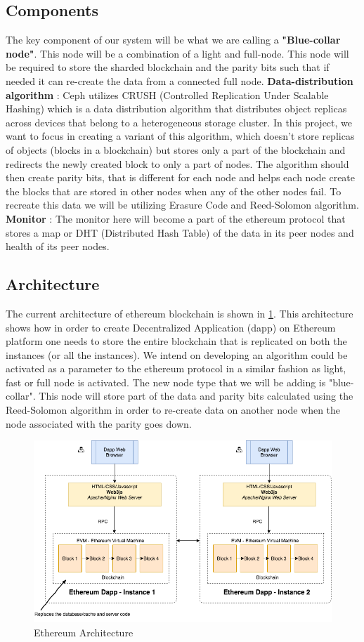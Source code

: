 \documentclass[conference]{IEEEtran}
\begin{document}
\subsection{Components}
The key component of our system will be what we are calling a
\textbf{"Blue-collar node"}.
This node will be a combination of a light and full-node. This node will be
required to store the sharded blockchain and the parity bits such that if needed
it can re-create the data from a connected full node. \textbf{Data-distribution
algorithm} : Ceph utilizes CRUSH \cite{crush} (Controlled Replication Under
Scalable Hashing) which is a data distribution algorithm that distributes object
replicas across devices that belong to a heterogeneous storage cluster. In this
project, we want to focus in creating a variant of this algorithm, which doesn't
store replicas of objects (blocks in a blockchain) but stores only a part of the
blockchain and redirects the newly created block to only a part of nodes.
The algorithm should then create parity bits, that is different for each node
and helps each node create the blocks that are stored in other nodes when
any of the other nodes fail. To recreate this data we will be utilizing Erasure
Code\cite{erasure} and Reed-Solomon algorithm\cite{reed}.
\textbf{Monitor} : The monitor here will become a part of the ethereum protocol that
stores a map or DHT (Distributed Hash Table) of the data in its peer nodes and 
health of its peer nodes. 

\subsection{Architecture}
The current architecture of ethereum blockchain is shown in \ref{image: fig1}.
This architecture shows how in order to create Decentralized Application (dapp)
on Ethereum platform one needs to store the entire blockchain that is replicated
on both the instances (or all the instances). We intend on developing an
algorithm could be activated as a parameter to the ethereum protocol in a similar
fashion as light, fast or full node is activated. The new node type that we will
be adding is "blue-collar". This node will store part of the data and parity
bits calculated using the Reed-Solomon algorithm in order to re-create data on
another node when the node associated with the parity goes down.  

\begin{figure}
    \includegraphics[width=.8\columnwidth]{files/ethArch.png}
    \centering
    \caption{Ethereum Architecture \cite{img} }
    \label{image: fig1}
\end{figure}
\end{document}
